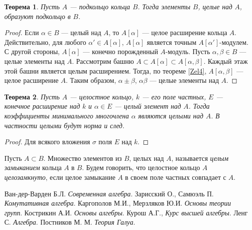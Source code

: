 \documentclass[12pt, titlepage, oneside]{amsbook}
\newtheorem{theorem}{Теорема}[chapter]
\theoremstyle{definition}
\theoremstyle{remark}
\begin{document}
\begin{theorem}
\label{Zel5}
Пусть $A$ --- подкольцо кольца $B$. Тогда элементы $B$, целые над $A$, образуют подкольцо в $B$.
\end{theorem}

\begin{proof}
Если $\alpha\in B$ --- целый над $A$, то $A[\alpha]$ --- целое расширение кольца $A$. Действительно, для любого $\alpha'\in A[\alpha]$, $A[\alpha]$ является точным $A[\alpha']$-модулем. С другой стороны, $A[\alpha]$ --- конечно порожденный $A$-модуль. Пусть $\alpha,\beta\in B$ --- целые элементы над $A$. Рассмотрим башню $A\subset A[\alpha]\subset A[\alpha,\beta]$. Каждый этаж этой башни является целым расширением. Тогда, по теореме \ref{Zel4}, $A[\alpha,\beta]$ --- целое расширение $A$. Таким образом, $\alpha\pm\beta$, $\alpha\beta$ --- целые элементы над $A$.
\end{proof}

\begin{theorem}
\label{Zel6}
Пусть $A$ --- целостное кольцо, $k$ --- его поле частных, $E$ --- конечное расширение над $k$ и $\alpha\in E$ --- целый элемент над $A$. Тогда коэффициенты минимального многочлена $\alpha$ являются целыми над $A$. В частности целыми будут норма и след.
\end{theorem}

\begin{proof}
Для всякого вложения $\sigma$ поля $E$ над $k$.
\end{proof}

Пусть $A\subset B$. Множество элементов из $B$, целых над $A$, называется \emph{целым замыканием} кольца $A$ в $B$. Будем говорить, что целостное кольцо $A$ \emph{целозамкнуто}, если целое замыкание $A$ в своем поле частных совпадает с $A$.







\begin{thebibliography}{lll}
Ван-дер-Варден Б.Л. \emph{Современная алгебра}.
Зарисский О., Самюэль П. \emph{Комутативная алгебра}.
Каргополов М.И., Мерзляков Ю.И. \emph{Основы теории групп}.
Кострикин А.И. \emph{Основы алгебры}.
Курош А.Г., \emph{Курс высшей алгебры}.
Ленг С. \emph{Алгебра}.
Постников М. М. \emph{Теория Галуа}.





\end{thebibliography}
\end{document}
